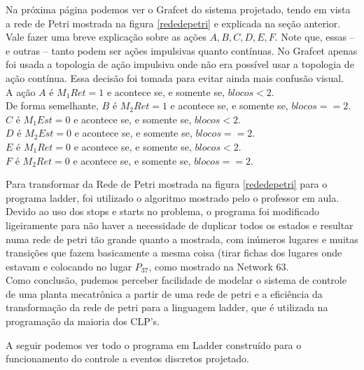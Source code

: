 \documentclass[a4paper,twoside]{articlewithlogo}
\begin{document}
Na próxima página podemos ver o Grafcet do sistema projetado, tendo em vista a rede de Petri mostrada na figura \ref{rededepetri} e explicada na seção anterior.
Vale fazer uma breve explicação sobre as ações $A, B, C, D, E, F$. Note que, essas -- e outras -- tanto podem ser ações impulsivas quanto contínuas. No Grafcet apenas foi usada a topologia de ação impulsiva onde não era possível usar a topologia de ação contínua. Essa decisão foi tomada para evitar ainda mais confusão visual.\\ A ação $A$ é $M_1Ret=1$ e acontece se, e somente se, $blocos<2$. \\ De forma semelhante, $B$ é $M_2Ret=1$ e acontece se, e somente se, $blocos==2$. \\ $C$ é $M_1Est=0$ e acontece se, e somente se, $blocos<2$. \\ $D$ é $M_2Est=0$ e acontece se, e somente se, $blocos==2$. \\ $E$ é $M_1Ret=0$ e acontece se, e somente se, $blocos<2$. \\ $F$ é $M_2Ret=0$ e acontece se, e somente se, $blocos==2$. 
\eject \pdfpagewidth=420mm \pdfpageheight=594mm

\eject \pdfpagewidth=210mm \pdfpageheight=297mm
Para transformar da Rede de Petri mostrada na figura \ref{rededepetri} para o programa ladder, foi utilizado o algoritmo mostrado pelo o professor em aula. Devido ao uso dos stops e starts no problema, o programa foi modificado ligeiramente para não haver a necessidade de duplicar todos os estados e resultar numa rede de petri tão grande quanto a mostrada, com inúmeros lugares e muitas transições que fazem basicamente a mesma coisa (tirar fichas dos lugares onde estavam e colocando no lugar $P_{37}$, como mostrado na Network 63. \\

Como conclusão, pudemos perceber facilidade de modelar o sistema de controle de uma planta mecatrônica a partir de uma rede de petri e a eficiência da transformação da rede de petri para a linguagem ladder, que é utilizada na programação da maioria dos CLP's.





\appendix
  A seguir podemos ver todo o programa em Ladder construído para o funcionamento do controle a eventos discretos projetado.





\end{document}
